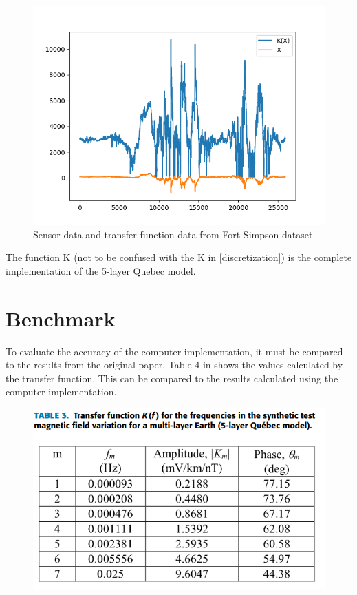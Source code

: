 \documentclass[10pt,a4paper,twoside]{article}
\begin{document}
\begin{multicols}{2}
       
 	\begin{figure}[!ht]
	   \begin{center}
	        \includegraphics[width=\columnwidth]{Latex/fsim.png}
	       \caption{Sensor data and transfer function data from Fort Simpson dataset}
	   \end{center}
	
	\end{figure}  
   
   The function K (not to be confused with the K in \ref{discretization}) is the complete implementation of the 5-layer Quebec model. 
   
   \section{Benchmark}
   To evaluate the accuracy of the computer implementation, it must be compared to the results from the original paper. Table 4 in \cite{8859181} shows the values calculated by the transfer function. This can be compared to the results calculated using the computer implementation. 
   

   
   	\begin{figure}
		\begin{center}
		    \includegraphics[width=\columnwidth]{Latex/Figure_3.png}
		    

\end{center}
\end{figure}
\end{multicols}
\end{document}
